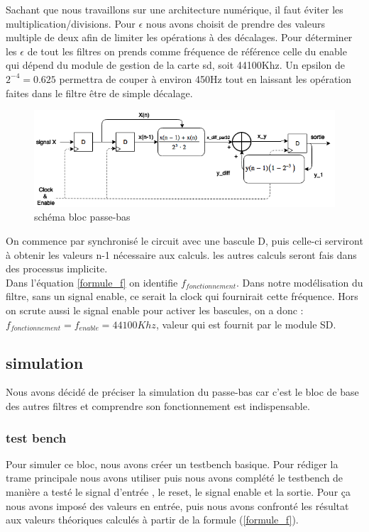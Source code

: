 \documentclass[hidelinks]{article}
\begin{document}
    Sachant que nous travaillons sur une architecture numérique, il faut éviter les multiplication/divisions. Pour $\epsilon$ nous avons choisit de prendre des valeurs multiple de deux afin de limiter les opérations à des décalages.    
    Pour déterminer les $\epsilon$ de tout les filtres on prends comme fréquence de référence celle du enable qui dépend du module de gestion de la carte sd, soit 44100Khz. Un epsilon de $2^{-4}=0.625$ permettra de couper à environ 450Hz tout en laissant les opération faites dans le filtre être de simple décalage.
    \begin{figure}[H]
    	\centering
    	 		\includegraphics[width=12cm,
    	 		keepaspectratio=true]{filtre_passe_bas.PNG}
    	\caption{\label{passe_bas}schéma bloc passe-bas}
    \end{figure}
   	On commence par synchronisé le circuit avec une bascule D, puis celle-ci serviront à obtenir les valeurs n-1 nécessaire aux calculs. les autres calculs seront fais dans des processus implicite.\\
   	Dans l'équation \ref{formule_f} on identifie $f_{fonctionnement}$. Dans notre modélisation du filtre, sans un signal enable, ce serait la clock qui fournirait cette fréquence. Hors on scrute aussi le signal enable pour activer les bascules, on a donc :\\$f_{fonctionnement}=f_{enable}=44100Khz$, valeur qui est fournit par le module SD.
   	
    \subsection{simulation}
	Nous avons décidé de préciser la simulation du passe-bas car c'est le bloc de base des autres filtres et comprendre son fonctionnement est indispensable.

    
    \subsubsection{test bench}
    Pour simuler ce bloc, nous avons créer un testbench basique. Pour rédiger la trame principale nous avons utiliser \cite{lapinoo} puis nous avons complété le testbench de manière a testé le signal d'entrée , le reset, le signal enable et la sortie. Pour ça nous avons imposé des valeurs en entrée, puis nous avons confronté les résultat aux valeurs théoriques calculés à partir de la formule (\ref{formule_f}).\\
    
\end{document}
